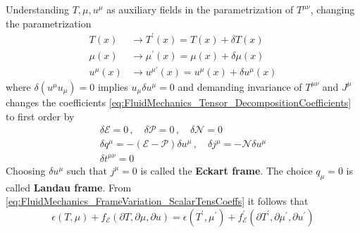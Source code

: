 Understanding $T,\mu,u^\mu$ as auxiliary fields in the parametrization of $T^{\mu\nu}$, changing the parametrization 
\begin{subequations}
    \begin{align}
        T(x)     & \to T^\prime(x)=T(x)+\delta T(x)              \\
        \mu(x)   & \to \mu^\prime(x)=\mu(x)+\delta\mu(x)         \\
        u^\mu(x) & \to u^{\mu\prime}(x)=u^\mu(x)+\delta u^\mu(x)
    \end{align}
\end{subequations}
where $\delta(u^\mu u_\mu)=0$ implies $u_\mu\delta u^\mu=0$ and demanding invariance of $T^{\mu\nu}$ and $J^\mu$ changes the coefficients \eqref{eq:FluidMechanics_Tensor_DecompositionCoefficients} to first order by
\begin{subequations}
    \begin{gather}
        \delta\mathcal{E}=0\,,\quad\delta\mathcal{P}=0\,,\quad\delta\mathcal{N}=0\label{eq:FluidMechanics_FrameVariation_ScalarTensCoeffs}\\
        \delta q^\mu=-(\mathcal{E}-\mathcal{P})\delta u^\mu\,,\quad\delta j^\mu=-\mathcal{N}\delta u^\mu\label{eq:FluidMechanics_FrameVariation_rk1TensCoeffs}\\
        \delta t^{\mu\nu}=0\label{eq:FluidMechanics_FrameVariation_rk2TensCoeffs}
    \end{gather}
\end{subequations}
Choosing $\delta u^\mu$ such that $j^\mu=0$ is called the \textbf{Eckart frame}. The choice $q_\mu=0$ is called \textbf{Landau frame}. From \eqref{eq:FluidMechanics_FrameVariation_ScalarTensCoeffs} it follows that
\begin{equation*}
    \epsilon(T,\mu)+f_{\mathcal{E}}(\partial T,\partial\mu,\partial u)=\epsilon(T^\prime,\mu^\prime)+f^\prime_{\mathcal{E}}(\partial T^\prime,\partial\mu^\prime,\partial u^\prime)
\end{equation*}
